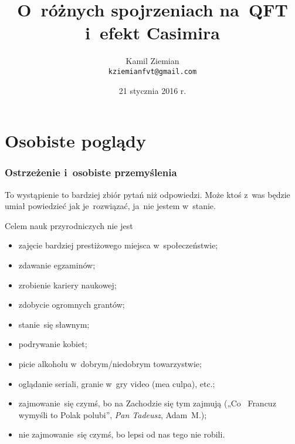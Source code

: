 \documentclass[10pt,t]{beamer}
\title{O~różnych spojrzeniach na~QFT i~efekt Casimira}
\author{Kamil Ziemian \\
  \texttt{kziemianfvt@gmail.com}}
\date[21 I 2016]{21 stycznia 2016 r.}
\begin{document}






\RaggedRight





\maketitle





\section{Osobiste poglądy}



\begin{frame}
  \frametitle{Ostrzeżenie i~osobiste przemyślenia}


  To wystąpienie to bardziej zbiór pytań niż odpowiedzi. Może ktoś z~was
  będzie umiał powiedzieć jak je~rozwiązać, ja~nie jestem w~stanie.

  Celem nauk przyrodniczych nie jest
  \begin{itemize}
    \RaggedRight

  \item zajęcie bardziej prestiżowego miejsca w~społeczeństwie;

  \item zdawanie egzaminów;

  \item zrobienie kariery naukowej;

  \item zdobycie ogromnych grantów;

  \item stanie~się sławnym;

  \item podrywanie kobiet;

  \item picie alkoholu w~dobrym/niedobrym towarzystwie;

  \item oglądanie seriali, granie w~gry video (mea culpa), etc.;

  \item zajmowanie~się czymś, bo na Zachodzie się tym zajmują
    („Co~ Francuz wymyśli to Polak polubi”, \textit{Pan Tadeusz}, Adam~M.);

  \item nie zajmowanie~się czymś, bo lepsi od nas tego nie
    robili.

  \end{itemize}

\end{frame}
\end{document}
